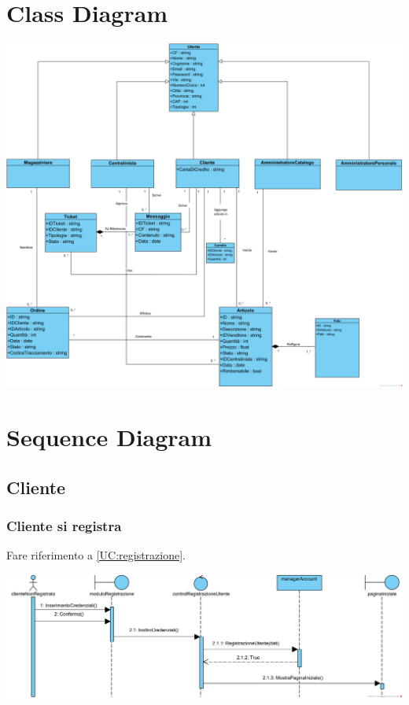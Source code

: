 \documentclass[12pt]{article}
\begin{document}
\section{Class Diagram}
\includegraphics[width=\textwidth]{diagrammadiclasse}

\newpage

\section{Sequence Diagram}
\subsection{Cliente}
\subsubsection{Cliente si registra}
\label{SD:registrazione}

Fare riferimento a \ref{UC:registrazione}. \\

\begin{center}
\includegraphics[width=\textwidth]{SequenceDiagram/ClienteRegistrazione}
\end{center}
\end{document}
